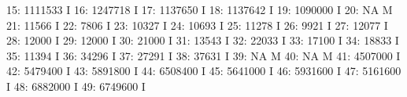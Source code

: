 \documentclass[nojss]{jss}
\begin{document}
\begin{Schunk}
\begin{Soutput}
 15:                    1111533                                          I
 16:                    1247718                                          I
 17:                    1137650                                          I
 18:                    1137642                                          I
 19:                    1090000                                          I
 20:                         NA                                          M
 21:                      11566                                          I
 22:                       7806                                          I
 23:                      10327                                          I
 24:                      10693                                          I
 25:                      11278                                          I
 26:                       9921                                          I
 27:                      12077                                          I
 28:                      12000                                          I
 29:                      12000                                          I
 30:                      21000                                          I
 31:                      13543                                          I
 32:                      22033                                          I
 33:                      17100                                          I
 34:                      18833                                          I
 35:                      11394                                          I
 36:                      34296                                          I
 37:                      27291                                          I
 38:                      37631                                          I
 39:                         NA                                          M
 40:                         NA                                          M
 41:                    4507000                                          I
 42:                    5479400                                          I
 43:                    5891800                                          I
 44:                    6508400                                          I
 45:                    5641000                                          I
 46:                    5931600                                          I
 47:                    5161600                                          I
 48:                    6882000                                          I
 49:                    6749600                                          I

\end{Soutput}
\end{Schunk}
\end{document}
